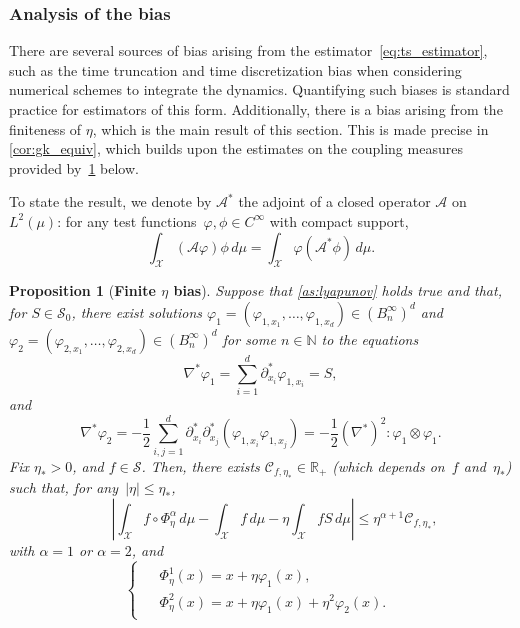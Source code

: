 \documentclass[11pt]{article}
\newcommand{\R}{\mathbb{R}}
\newcommand{\N}{\mathbb{N}}
\renewcommand{\S}{\mathscr{S}}
\renewcommand{\leq}{\leqslant}
\newtheorem{proposition}{Proposition}
\theoremstyle{definition}
\begin{document}
\subsubsection{Analysis of the bias}
\label{subsubsec:bias_analysis}
There are several sources of bias arising from the estimator~\eqref{eq:ts_estimator}, such as the time truncation and time discretization bias when considering numerical schemes to integrate the dynamics. Quantifying such biases is standard practice for estimators of this form. Additionally, there is a bias arising from the finiteness of $\eta$, which is the main result of this section. This is made precise in \cref{cor:gk_equiv}, which builds upon the estimates on the coupling measures provided by~\cref{prop:gen_subtraction} below. 

To state the result, we denote by $\mathcal{A}^*$ the adjoint of a closed operator $\mathcal{A}$ on $L^2(\mu)$: for any test functions~$\varphi, \phi \in C^\infty$ with compact support,
\begin{equation}
    \int_\mathcal{X} (\mathcal{A}\varphi)\phi \, d\mu = \int_\mathcal{X} \varphi(\mathcal{A}^*\phi) \, d\mu.
    \label{eq:Astar_adjoint}
\end{equation}

\begin{proposition}[{\bf Finite $\eta$ bias}]
\label{prop:gen_subtraction}
Suppose that \cref{as:lyapunov} holds true and that, for $S\in\S_0$, there exist solutions $\varphi_1 = (\varphi_{1,x_1},\dotsc,\varphi_{1,x_d}) \in (B^\infty_n)^d$ and $\varphi_2=(\varphi_{2,x_1},\dotsc,\varphi_{2,x_d}) \in (B^\infty_n)^d$ for some $n\in\N$ to the equations
\begin{equation}
	\nabla^*\varphi_1 = \sum_{i=1}^d \partial_{x_i}^* \varphi_{1,x_i} = S, \label{eq:varphi1_PDE}
\end{equation}
and
\begin{equation}
	\nabla^*\varphi_2 = -\frac{1}{2}\sum_{i,j=1}^d \partial_{x_i}^*\partial_{x_j}^* (\varphi_{1,x_i}\varphi_{1,x_j}) = -\frac{1}{2}(\nabla^*)^2 \colon \varphi_1\otimes \varphi_1.
	\label{eq:varphi2_PDE}
\end{equation}
Fix $\eta_*>0$, and $f\in \S$. Then, there exists $\mathcal{C}_{f,\eta_*} \in\R_+$ (which depends on~$f$ and~$\eta_*$) such that, for any~$|\eta| \leq \eta_*$,
\begin{equation}
	\qquad \left|\int_\mathcal{X} f\circ\Phi^\alpha_\eta \, d\mu - \int_\mathcal{X} f \, d\mu - \eta\int_\mathcal{X} f S \, d\mu\right| \leq \eta^{\alpha+1} \mathcal{C}_{f,\eta_*},
	\label{eq:prop_eta_bias_bound}
\end{equation}
with $\alpha=1$ or $\alpha=2$, and
\begin{equation}
\begin{cases}
\begin{aligned}
	&\Phi_\eta^1(x) = x + \eta\varphi_1(x), \\
	&\Phi_\eta^2(x) = x + \eta\varphi_1(x) + \eta^2\varphi_2(x).
\end{aligned}
\end{cases}
\label{eq:Phi_alpha}
\end{equation}
\end{proposition}
\end{document}
